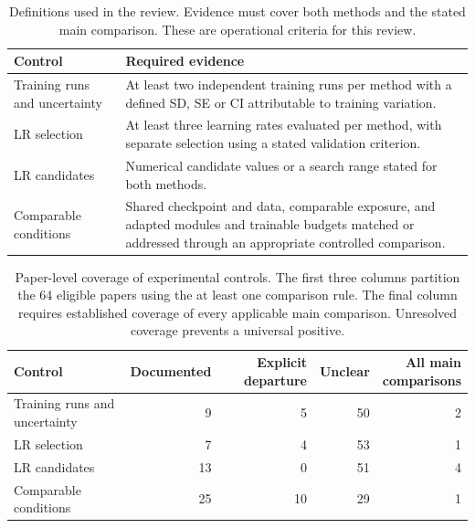 \begin{table}[!htbp]
\captionsetup{labelsep=period}
\caption{Definitions used in the review. Evidence must cover both methods and the stated main comparison. These are operational criteria for this review.}
\label{tab:peft-review-criteria}
\centering
\begin{tabular}{@{}p{.25\linewidth}p{.71\linewidth}@{}}
\toprule
Control & Required evidence \\
\midrule
Training runs and uncertainty & At least two independent training runs per method with a defined SD, SE or CI attributable to training variation. \\
LR selection & At least three learning rates evaluated per method, with separate selection using a stated validation criterion. \\
LR candidates & Numerical candidate values or a search range stated for both methods. \\
Comparable conditions & Shared checkpoint and data, comparable exposure, and adapted modules and trainable budgets matched or addressed through an appropriate controlled comparison. \\
\bottomrule
\end{tabular}
\end{table}

\begin{table}[!htbp]
\captionsetup{labelsep=period}
\caption{Paper-level coverage of experimental controls. The first three columns partition the 64 eligible papers using the at least one comparison rule. The final column requires established coverage of every applicable main comparison. Unresolved coverage prevents a universal positive.}
\label{tab:peft-review-coverage}
\centering
\begin{tabular*}{\linewidth}{@{\extracolsep{\fill}}lrrrr@{}}
\toprule
Control & Documented & Explicit departure & Unclear & \shortstack{All main\\comparisons} \\
\midrule
Training runs and uncertainty & 9 & 5 & 50 & 2 \\
LR selection & 7 & 4 & 53 & 1 \\
LR candidates & 13 & 0 & 51 & 4 \\
Comparable conditions & 25 & 10 & 29 & 1 \\
\bottomrule
\end{tabular*}
\end{table}

